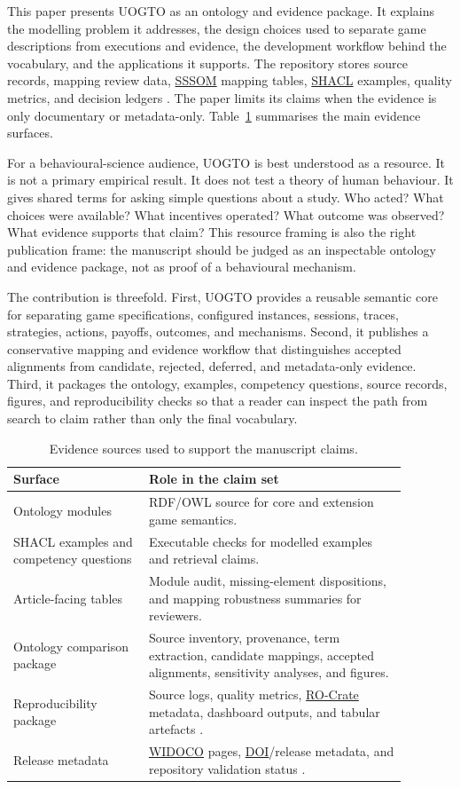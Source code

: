 \documentclass[11pt]{article}
\newcommand{\abblink}[2]{\hyperlink{abbr:#1}{#2}}
\begin{document}
This paper presents UOGTO as an ontology and evidence package. It explains the modelling problem it addresses, the design choices used to separate game descriptions from executions and evidence, the development workflow behind the vocabulary, and the applications it supports. The repository stores source records, mapping review data, \abblink{sssom}{SSSOM} mapping tables, \abblink{shacl}{SHACL} examples, quality metrics, and decision ledgers \cite{sssom-2022}. The paper limits its claims when the evidence is only documentary or metadata-only. Table~\ref{tab:evidence-surfaces} summarises the main evidence surfaces.

For a behavioural-science audience, UOGTO is best understood as a resource. It is not a primary empirical result. It does not test a theory of human behaviour. It gives shared terms for asking simple questions about a study. Who acted? What choices were available? What incentives operated? What outcome was observed? What evidence supports that claim? This resource framing is also the right publication frame: the manuscript should be judged as an inspectable ontology and evidence package, not as proof of a behavioural mechanism.

The contribution is threefold. First, UOGTO provides a reusable semantic core for separating game specifications, configured instances, sessions, traces, strategies, actions, payoffs, outcomes, and mechanisms. Second, it publishes a conservative mapping and evidence workflow that distinguishes accepted alignments from candidate, rejected, deferred, and metadata-only evidence. Third, it packages the ontology, examples, competency questions, source records, figures, and reproducibility checks so that a reader can inspect the path from search to claim rather than only the final vocabulary.

\begin{table}[ht]
\centering
\caption{Evidence sources used to support the manuscript claims.}
\label{tab:evidence-surfaces}
\begin{tabular}{p{0.30\linewidth}p{0.58\linewidth}}
\toprule
Surface & Role in the claim set \\
\midrule
Ontology modules & RDF/OWL source for core and extension game semantics. \\
SHACL examples and competency questions & Executable checks for modelled examples and retrieval claims. \\
Article-facing tables & Module audit, missing-element dispositions, and mapping robustness summaries for reviewers. \\
Ontology comparison package & Source inventory, provenance, term extraction, candidate mappings, accepted alignments, sensitivity analyses, and figures. \\
Reproducibility package & Source logs, quality metrics, \abblink{rocrate}{RO-Crate} metadata, dashboard outputs, and tabular artefacts \cite{ro-crate-2022}. \\
Release metadata & \abblink{widoco}{WIDOCO} pages, \abblink{doi}{DOI}/release metadata, and repository validation status \cite{widoco-2017}. \\
\bottomrule
\end{tabular}
\end{table}
\end{document}
